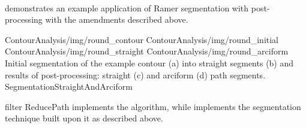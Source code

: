 \paragraph*{}
 demonstrates an example application of Ramer segmentation with post-processing with the amendments described above.

\fourFigures
{ContourAnalysis/img/round_contour}
{ContourAnalysis/img/round_initial}
{ContourAnalysis/img/round_straight}
{ContourAnalysis/img/round_arciform}
{Initial segmentation of the example contour (a) into straight segments (b) and results of post-processing: straight (c) and arciform (d) path segments.}
{SegmentationStraightAndArciform}
{\basicWidth}

\begin{refImpl}
\studio filter ReducePath implements the  algorithm, while  implements the segmentation technique built upon it as described above.
\end{refImpl}